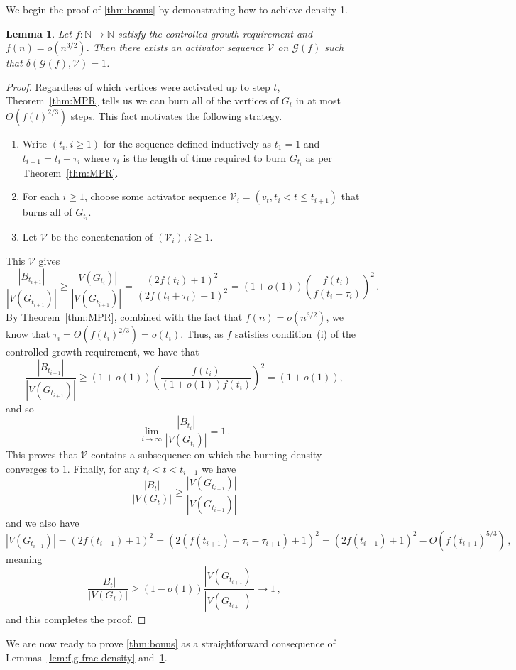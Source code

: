 \documentclass[12pt]{article}
\newtheorem{lemma}[theorem]{Lemma}
\theoremstyle{remark}
\providecommand{\N}{}
\renewcommand{\N}{{\mathbb N}}
\newcommand\cG{\mathcal G}
\newcommand\cV{\mathcal V}
\begin{document}
We begin the proof of \cref{thm:bonus} by demonstrating how to achieve density 1. 

\begin{lemma}\label{lem:(d) upper}
Let $f : \N \to \N$ satisfy the controlled growth requirement and $f(n) = o(n^{3/2})$. Then there exists an activator sequence $\cV$ on $\cG(f)$ such that $\delta(\cG(f),\cV) = 1$. 
\end{lemma}
\begin{proof}
Regardless of which vertices were activated up to step $t$, Theorem~\ref{thm:MPR} tells us we can burn all of the vertices of $G_t$ in at most $\Theta(f(t)^{2/3})$ steps. This fact motivates the following strategy.
\begin{enumerate}
\item Write $(t_i,i\geq 1)$ for the sequence defined inductively as $t_1 = 1$ and $t_{i+1} = t_i + \tau_i$ where $\tau_i$ is the length of time required to burn $G_{t_i}$ as per Theorem~\ref{thm:MPR}. 
\item For each $i \geq 1$, choose some activator sequence $\cV_i = (v_{t}, t_i < t \leq t_{i+1})$ that burns all of $G_{t_i}$. 
\item Let $\cV$ be the concatenation of $(\cV_i),i \geq 1$. 
\end{enumerate} 
This $\cV$ gives 
\[
\frac{|B_{t_{i+1}}|}{|V(G_{t_{i+1}})|} 
\geq 
\frac{|V(G_{t_{i}})|}{|V(G_{t_{i+1}})|} 
= 
\frac{(2f(t_i)+1)^2}{(2f(t_i + \tau_i)+1)^2}
=
(1+o(1)) \left(\frac{f(t_i)}{f(t_i+\tau_i)}\right)^2 \,.
\]
By Theorem~\ref{thm:MPR}, combined with the fact that $f(n) = o(n^{3/2})$, we know that $\tau_i = \Theta(f(t_i)^{2/3}) = o(t_i)$. Thus, as $f$ satisfies condition~(i) of the controlled growth requirement, we have that
\[
\frac{|B_{t_{i+1}}|}{|V(G_{t_{i+1}})|}  
\geq 
(1+o(1)) \left(\frac{f(t_i)}{(1+o(1))f(t_i)}\right)^2
=
(1+o(1)),
\]
and so 
\[
\lim_{i \to \infty} \frac{|B_{t_{i}}|}{|V(G_{t_{i}})|} = 1 \,.
\]
This proves that $\cV$ contains a subsequence on which the burning density converges to $1$. Finally, for any $t_i < t < t_{i+1}$ we have 
\[
\frac{|B_t|}{|V(G_t)|} \geq \frac{|V(G_{t_{i-1}})|}{|V(G_{t_{i+1}})|} 
\]
and we also have 
\[
|V(G_{t_{i-1}})| 
= 
(2f(t_{i-1})+1)^2
=
(2(f(t_{i+1})-\tau_i-\tau_{i+1})+1)^2
=
(2f(t_{i+1})+1)^2 - O(f(t_{i+1})^{5/3}) \,,
\]
meaning 
\[
\frac{|B_t|}{|V(G_t)|} \geq (1-o(1)) \frac{|V(G_{t_{i+1}})|}{|V(G_{t_{i+1}})|} \to 1 \,,
\]
and this completes the proof. 
\end{proof}

We are now ready to prove \cref{thm:bonus} as a straightforward consequence of Lemmas~\ref{lem:f,g frac density} and~\ref{lem:(d) upper}.
\end{document}
